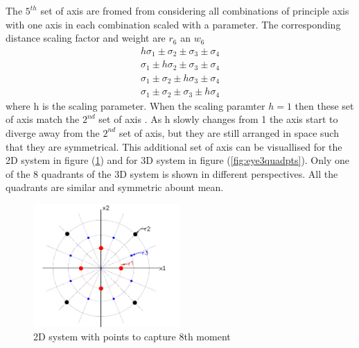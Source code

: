 \documentclass{article}
\begin{document}
The $5^{th}$ set of axis are fromed from considering all combinations of principle axis with one axis in each combination scaled with a parameter. The corresponding distance scaling factor and weight are $r_6$ an $w_6$ 
\begin{align}
 h \sigma_1 \pm \sigma_2 \pm \sigma_3 \pm \sigma_4 \nonumber \\
   \sigma_1 \pm h\sigma_2 \pm \sigma_3 \pm \sigma_4 \nonumber \\
   \sigma_1 \pm \sigma_2 \pm h\sigma_3 \pm \sigma_4 \nonumber \\
   \sigma_1 \pm \sigma_2 \pm \sigma_3 \pm h\sigma_4 \nonumber 
\end{align}
where h is the scaling parameter. When the scaling paramter $h=1$ then these set of axis match the $2^{nd}$ set of axis . As h slowly changes from 1 the axis start to diverge away from the $2^{nd}$ set of axis, but they are still arranged in space such that they are symmetrical. This additional set of axis can be visuallised for the 2D system in figure (\ref{fig:eye2quadpts}) and for 3D system in figure (\ref{fig:eye3quadpts}). Only one of the 8 quadrants of the 3D system is shown in different perspectives. All the quadrants are similar and symmetric abount mean.\newline
\begin{figure}[h]
	\centering
	\includegraphics[width=0.5\textwidth]{2d1.jpg}
	\caption{2D system with points to capture 8th moment}
	\label{fig:eye2quadpts}
\end{figure}\newline
\end{document}
